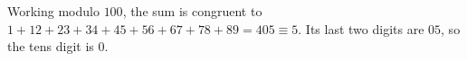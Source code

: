 Working modulo $ 100 $, the sum is congruent to $ 1+12+23+34+45+56+67+78+89=405\equiv5 $. Its last two digits are $ 05 $, so the tens digit is $\boxed0 $.
